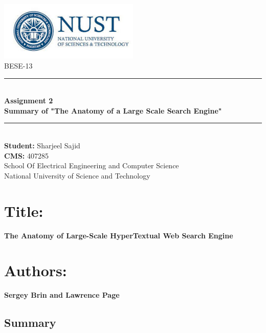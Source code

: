 \documentclass[a4paper, 12pt]{article}
\newcommand{\HRule}{\rule{\linewidth}{0.5mm}}
\begin{document}
\begin{titlepage}
  \begin{center}
    \includegraphics[width=0.5\textwidth]{figures/ne2.jpg}~\\[2cm]

    \textsc{\Large BESE-13}\\[2cm]


    \HRule \\[0.4cm]
    {\large \bfseries Assignment 2 \\ Summary of "The Anatomy of a Large Scale Search Engine"\\[0.4cm]}
    \HRule \\[4cm]

    \large\textbf{Student:}
    Sharjeel Sajid\\
    \large\textbf{CMS:}
    407285
    \\ School Of Electrical Engineering and Computer Science \\ National University of Science and Technology\\[3cm]

    \vfill


  \end{center}
\end{titlepage}

\newpage

\tableofcontents

\newpage
\section*{Title:} \textbf{The Anatomy of Large-Scale HyperTextual Web Search Engine}
\section*{Authors:}\textbf{Sergey Brin and Lawrence Page} 
\begin{center}
\section*{Summary}
\end{center}
\end{document}
